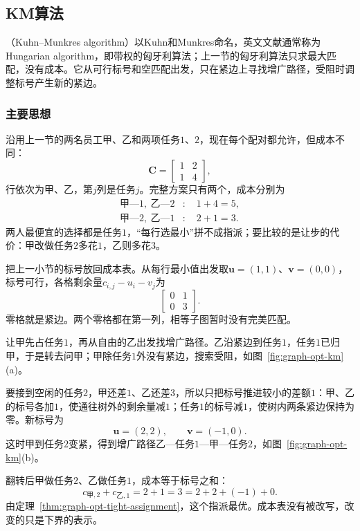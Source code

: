 \subsection{KM算法}
\label{sec:graph-opt-hungarian}

（Kuhn--Munkres algorithm）以Kuhn和Munkres命名，英文文献通常称为Hungarian algorithm，即带权的匈牙利算法；上一节的匈牙利算法只求最大匹配，没有成本。它从可行标号和空匹配出发，只在紧边上寻找增广路径，受阻时调整标号产生新的紧边。

\subsubsection{主要思想}

沿用上一节的两名员工甲、乙和两项任务$1$、$2$，现在每个配对都允许，但成本不同：
\[
  \bm C=\begin{bmatrix}1&2\\1&4\end{bmatrix},
\]
行依次为甲、乙，第$j$列是任务$j$。完整方案只有两个，成本分别为
\[
  \begin{aligned}
    \text{甲—}1,\ \text{乙—}2&:\quad 1+4=5,\\
    \text{甲—}2,\ \text{乙—}1&:\quad 2+1=3.
  \end{aligned}
\]
两人最便宜的选择都是任务$1$，“每行选最小”拼不成指派；要比较的是让步的代价：甲改做任务$2$多花$1$，乙则多花$3$。

把上一小节的标号放回成本表。从每行最小值出发取$\bm u=(1,1)$、$\bm v=(0,0)$，标号可行，各格剩余量$c_{i,j}-u_i-v_j$为
\[
  \begin{bmatrix}0&1\\0&3\end{bmatrix}.
\]
零格就是紧边。两个零格都在第一列，相等子图暂时没有完美匹配。

让甲先占任务$1$，再从自由的乙出发找增广路径。乙沿紧边到任务$1$，任务$1$已归甲，于是转去问甲；甲除任务$1$外没有紧边，搜索受阻，如图~\ref{fig:graph-opt-km}(a)。

要接到空闲的任务$2$，甲还差$1$、乙还差$3$，所以只把标号推进较小的差额$1$：甲、乙的标号各加$1$，使通往树外的剩余量减$1$；任务$1$的标号减$1$，使树内两条紧边保持为零。新标号为
\[
  \bm u=(2,2),\qquad\bm v=(-1,0).
\]
这时甲到任务$2$变紧，得到增广路径乙—任务$1$—甲—任务$2$，如图~\ref{fig:graph-opt-km}(b)。

翻转后甲做任务$2$、乙做任务$1$，成本等于标号之和：
\[
  c_{\text{甲},2}+c_{\text{乙},1}=2+1=3=2+2+(-1)+0.
\]
由定理~\ref{thm:graph-opt-tight-assignment}，这个指派最优。成本表没有被改写，改变的只是下界的表示。

